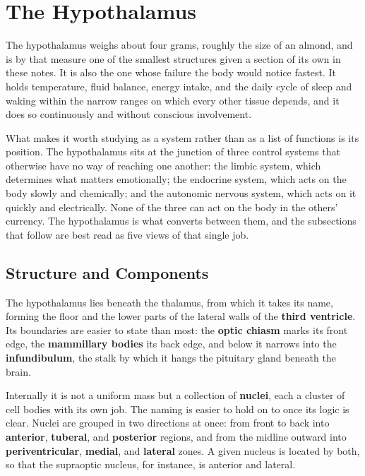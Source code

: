 \documentclass[11pt]{article}
\begin{document}
\section{The Hypothalamus}

The hypothalamus weighs about four grams, roughly the size of an almond, and is by that measure one of the smallest structures given a section of its own in these notes. It is also the one whose failure the body would notice fastest. It holds temperature, fluid balance, energy intake, and the daily cycle of sleep and waking within the narrow ranges on which every other tissue depends, and it does so continuously and without conscious involvement.

What makes it worth studying as a system rather than as a list of functions is its position. The hypothalamus sits at the junction of three control systems that otherwise have no way of reaching one another: the limbic system, which determines what matters emotionally; the endocrine system, which acts on the body slowly and chemically; and the autonomic nervous system, which acts on it quickly and electrically. None of the three can act on the body in the others' currency. The hypothalamus is what converts between them, and the subsections that follow are best read as five views of that single job.

\subsection{Structure and Components}

The hypothalamus lies beneath the thalamus, from which it takes its name, forming the floor and the lower parts of the lateral walls of the \textbf{third ventricle}. Its boundaries are easier to state than most: the \textbf{optic chiasm} marks its front edge, the \textbf{mammillary bodies} its back edge, and below it narrows into the \textbf{infundibulum}, the stalk by which it hangs the pituitary gland beneath the brain.

Internally it is not a uniform mass but a collection of \textbf{nuclei}, each a cluster of cell bodies with its own job. The naming is easier to hold on to once its logic is clear. Nuclei are grouped in two directions at once: from front to back into \textbf{anterior}, \textbf{tuberal}, and \textbf{posterior} regions, and from the midline outward into \textbf{periventricular}, \textbf{medial}, and \textbf{lateral} zones. A given nucleus is located by both, so that the supraoptic nucleus, for instance, is anterior and lateral.
\end{document}
